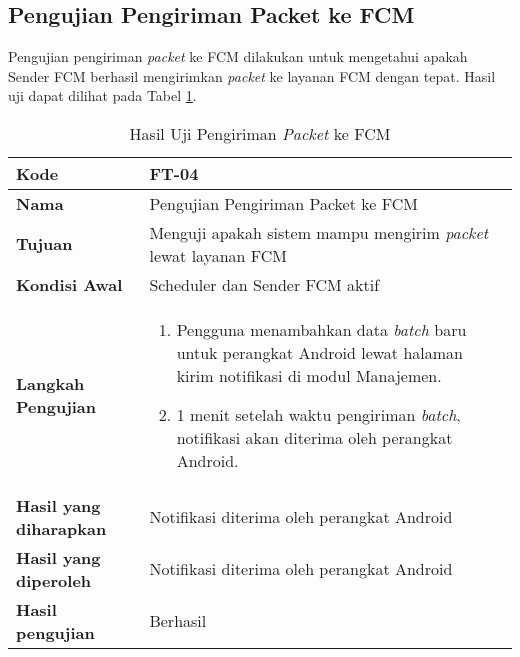 \subsection{Pengujian Pengiriman Packet ke FCM}
\par Pengujian pengiriman \textit{packet} ke FCM dilakukan untuk mengetahui apakah Sender FCM berhasil mengirimkan \textit{packet} ke layanan FCM dengan tepat. Hasil uji dapat dilihat pada Tabel \ref{t:uji_pengiriman_packet_fcm}.
\begin{longtable}{|p{3cm}|p{6.5cm}|}
	\caption{Hasil Uji Pengiriman \textit{Packet} ke FCM} \label{t:uji_pengiriman_packet_fcm} \\ \hline
	\textbf{Kode} & FT-04 \\ \hline
	\textbf{Nama} & Pengujian Pengiriman Packet ke FCM \\ \hline
	\textbf{Tujuan} & Menguji apakah sistem mampu mengirim \textit{packet} lewat layanan FCM \\ \hline
	\textbf{Kondisi Awal} & Scheduler dan Sender FCM aktif \\ \hline
	\textbf{Langkah Pengujian} &  
	\begin{enumerate}
		\item Pengguna menambahkan data \textit{batch} baru untuk perangkat Android lewat halaman kirim notifikasi di modul Manajemen.
		\item 1 menit setelah waktu pengiriman \textit{batch}, notifikasi akan diterima oleh perangkat Android.
	\end{enumerate} \\ \hline
	\textbf{Hasil yang diharapkan} & Notifikasi diterima oleh perangkat Android \\ \hline
	\textbf{Hasil yang diperoleh} & Notifikasi diterima oleh perangkat Android \\ \hline
	\textbf{Hasil pengujian} & Berhasil \\ \hline
\end{longtable}

